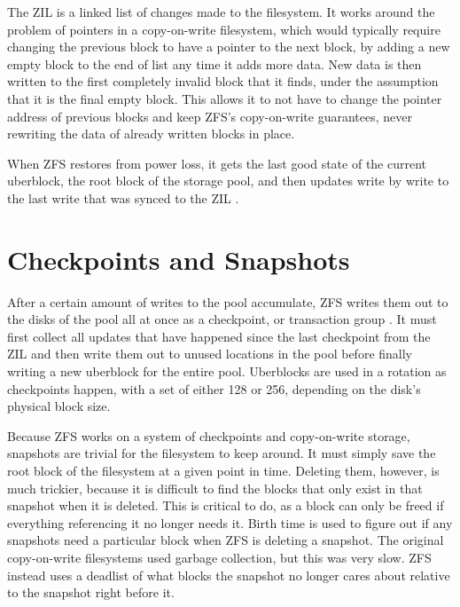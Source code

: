 The ZIL is a linked list of changes made to the filesystem.
It works around the problem of pointers in a copy-on-write filesystem, which would typically require
changing the previous block to have a pointer to the next block,
by adding a new empty block to the end of list any time it adds more data.
New data is then written to the first completely invalid block that it finds, 
under the assumption that it is the final empty block.
This allows it to not have to change the pointer address of previous blocks and keep ZFS's copy-on-write guarantees, 
never rewriting the data of already written blocks in place.

When ZFS restores from power loss, it gets the last good state of the current uberblock, the root block of the storage pool,
and then updates write by write to the last write that was synced to the ZIL \cite{mckusick_zfs_2015_presentation}.

\section{Checkpoints and Snapshots}
After a certain amount of writes to the pool accumulate, ZFS writes them out to the disks of the pool
all at once as a checkpoint, or transaction group
\cite{ahrens_read_write,mckusick_zfs_2015_presentation}.
It must first collect all updates that have happened since the last checkpoint from the ZIL
and then write them out to unused locations in the pool before finally writing a new uberblock for the entire pool.
Uberblocks are used in a rotation as checkpoints happen, with a set of either 128 or 256, depending on the disk's physical block size.

Because ZFS works on a system of checkpoints and copy-on-write storage, snapshots are trivial for the filesystem to keep around.
It must simply save the root block of the filesystem at a given point in time.
Deleting them, however, is much trickier, because it is difficult to find the blocks that only exist in that snapshot
when it is deleted.
This is critical to do, as a block can only be freed if everything referencing it no longer needs it.
Birth time is used to figure out if any snapshots need a particular block when ZFS is deleting a snapshot.
The original copy-on-write filesystems used garbage collection, but this was very slow.
ZFS instead uses a deadlist of what blocks the snapshot no longer cares about relative to the snapshot right before it.

